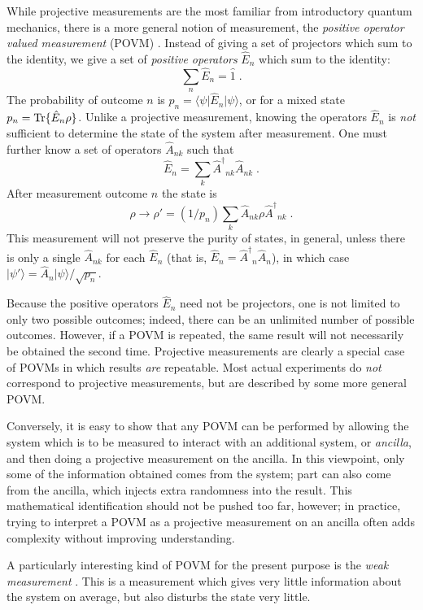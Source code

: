 \documentclass[12pt]{article}
\def\bra#1{{\langle #1 |}}
\def\ket#1{{| #1 \rangle}}
\def\id{{\hat 1}}
\def\tr{{\rm Tr}}
\def\E{{\hat E}}
\def\A{{\hat A}}
\def\Adag{{\hat A^\dagger}}
\begin{document}
While projective measurements are the most familiar from introductory
quantum mechanics, there is a more general notion of measurement, the
{\it positive operator valued measurement} (POVM) \cite{Peres}.
Instead of giving a set of projectors which sum to the identity, we
give a set of {\it positive operators} $\E_n$ which sum
to the identity:
\begin{equation}
\sum_n \E_n = \id \;.
\end{equation}
The probability of outcome $n$ is $p_n = \bra\psi\E_n\ket\psi$, or for
a mixed state $p_n = \tr\{\E_n\rho\}$.  Unlike a projective measurement,
knowing the operators $\E_n$ is {\it not} sufficient to determine the
state of the system after measurement.  One must further know a set of
operators $\A_{nk}$ such that
\begin{equation}
\E_n = \sum_k \Adag_{nk}\A_{nk} \;.
\end{equation}
After measurement outcome $n$ the state is
\begin{equation}
\rho \rightarrow \rho' = (1/p_n) \sum_k \A_{nk}\rho \Adag_{nk} \;.
\end{equation}
This measurement will not preserve the purity of states, in general, unless
there is only a single $\A_{nk}$ for each $\E_n$ (that is,
$\E_n = \Adag_n\A_n$), in which case $\ket{\psi'} = \A_n\ket\psi/\sqrt{p_n}$.

Because the positive operators $\E_n$ need not be projectors, one is not
limited to only two possible outcomes; indeed, there can be an unlimited
number of possible outcomes.  However, if a POVM is repeated, the same
result will not necessarily be obtained the second time.  Projective
measurements are clearly a special case of POVMs in which results {\it are}
repeatable.  Most actual experiments do {\it not} correspond to projective
measurements, but are described by some more general POVM.

Conversely, it is easy to show that any POVM can be performed by allowing
the system which is to be measured to interact with an
additional system, or {\it ancilla}, and then doing a projective measurement
on the ancilla.  In this viewpoint, only some of the information obtained
comes from the system; part can also come from the ancilla, which injects
extra randomness into the result.  This mathematical identification
should not be pushed too far, however; in practice, trying to interpret a
POVM as a projective measurement on an ancilla often adds complexity without
improving understanding.

A particularly interesting kind of POVM for the present purpose is the
{\it weak measurement} \cite{Vaidman}.
This is a measurement which gives very
little information about the system on average, but also disturbs the
state very little.
\end{document}
